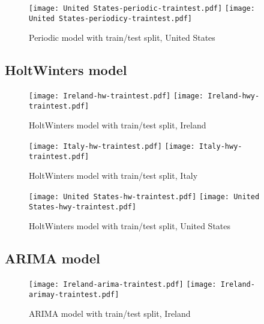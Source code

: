 \begin{figure}[H]
  \texttt{[image: United States-periodic-traintest.pdf]} \label{fig:us-periodic-traintest}
\endminipage\hfill
{}
  \texttt{[image: United States-periodicy-traintest.pdf]} \label{fig:us-periodicy-traintest}
\endminipage
\caption{Periodic model with train/test split, United States}
\end{figure}

\subsection{HoltWinters model}
\begin{figure}[H]
  \texttt{[image: Ireland-hw-traintest.pdf]} \label{fig:ireland-hw-traintest}
\endminipage\hfill
{}
  \texttt{[image: Ireland-hwy-traintest.pdf]} \label{fig:ireland-hwy-traintest}
\endminipage
\caption{HoltWinters model with train/test split, Ireland}
\end{figure}

\begin{figure}[H]
  \texttt{[image: Italy-hw-traintest.pdf]} \label{fig:italy-hw-traintest}
\endminipage\hfill
{}
  \texttt{[image: Italy-hwy-traintest.pdf]} \label{fig:italy-hwy-traintest}
\endminipage
\caption{HoltWinters model with train/test split, Italy}
\end{figure}

\begin{figure}[H]
  \texttt{[image: United States-hw-traintest.pdf]} \label{fig:us-hw-traintest}
\endminipage\hfill
{}
  \texttt{[image: United States-hwy-traintest.pdf]} \label{fig:us-hwy-traintest}
\endminipage
\caption{HoltWinters model with train/test split, United States}
\end{figure}

\subsection{ARIMA model}
\begin{figure}[H]
  \texttt{[image: Ireland-arima-traintest.pdf]} \label{fig:ireland-arima-traintest}
\endminipage\hfill
{}
  \texttt{[image: Ireland-arimay-traintest.pdf]} \label{fig:ireland-arimay-traintest}
\endminipage
\caption{ARIMA model with train/test split, Ireland}
\end{figure}


